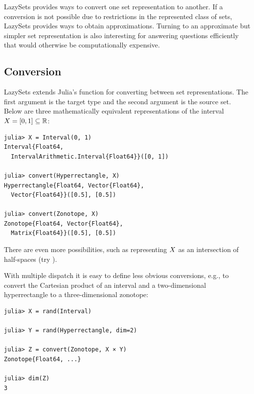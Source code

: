LazySets provides ways to convert one set representation to another.
If a conversion is not possible due to restrictions in the represented class of sets, LazySets provides ways to obtain approximations.
Turning to an approximate but simpler set representation is also interesting for answering questions efficiently that would otherwise be computationally expensive.


\subsection{Conversion}

LazySets extends Julia's  function for converting between set representations. The first argument is the target type and the second argument is the source set.
%
Below are three mathematically equivalent representations of the interval $X = [0, 1] \subseteq \mathbb{R}$:

\begin{minipage}{\linewidth}
	\vspace{-\abovedisplayskip}
	\begin{lstlisting}
julia> X = Interval(0, 1)
Interval{Float64,
  IntervalArithmetic.Interval{Float64}}([0, 1])

julia> convert(Hyperrectangle, X)
Hyperrectangle{Float64, Vector{Float64},
  Vector{Float64}}([0.5], [0.5])

julia> convert(Zonotope, X)
Zonotope{Float64, Vector{Float64},
  Matrix{Float64}}([0.5], [0.5])
	\end{lstlisting}
\end{minipage}
There are even more possibilities, such as representing $X$ as an intersection of half-spaces (try ).


\smallskip

With multiple dispatch it is easy to define less obvious conversions, e.g., to convert the Cartesian product of an interval and a two-dimensional hyperrectangle to a three-dimensional zonotope:

\begin{minipage}{\linewidth}
	\vspace{-\abovedisplayskip}
	\begin{lstlisting}
julia> X = rand(Interval)

julia> Y = rand(Hyperrectangle, dim=2)

julia> Z = convert(Zonotope, X × Y)
Zonotope{Float64, ...}

julia> dim(Z)
3
\end{lstlisting}
\end{minipage}



